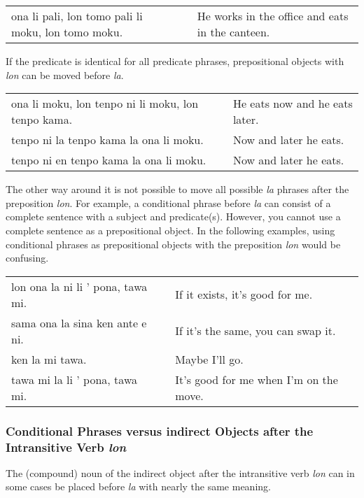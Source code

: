 \begin{supertabular}{p{5,5cm}|ll}
ona li pali, lon tomo pali li moku, lon tomo moku. && He works in the office and eats in the canteen.  \\
\end{supertabular}

If the predicate is identical for all predicate phrases, prepositional objects with \textit{lon} can be moved before \textit{la}.

\begin{supertabular}{p{5,5cm}|ll}
ona li moku, lon tenpo ni li moku, lon tenpo kama. && He eats now and he eats later. \\
tenpo ni la tenpo kama la ona li moku. && Now and later he eats. \\
tenpo ni en tenpo kama la ona li moku. && Now and later he eats. \\
\end{supertabular}

The other way around it is not possible to move all possible \textit{la} phrases after the preposition \textit{lon}. 
For example, a conditional phrase before \textit{la} can consist of a complete sentence with a subject and predicate(s). 
However, you cannot use a complete sentence as a prepositional object.
In the following examples, using conditional phrases as prepositional objects with the preposition \textit{lon} would be confusing. 

\begin{supertabular}{p{5,5cm}|ll}
lon ona la ni li ' pona, tawa mi. && If it exists, it's good for me. \\
sama ona la sina ken ante e ni. && If it's the same, you can swap it. \\
ken la mi tawa. && Maybe I'll go. \\
tawa mi la li ' pona, tawa mi.  && It's good for me when I'm on the move. \\
\end{supertabular}

%
%
\subsubsection*{Conditional Phrases versus indirect Objects after the Intransitive Verb \textit{lon} }
%
The (compound) noun of the indirect object after the intransitive verb \textit{lon} can in some cases be placed before \textit{la} with nearly the same meaning.

